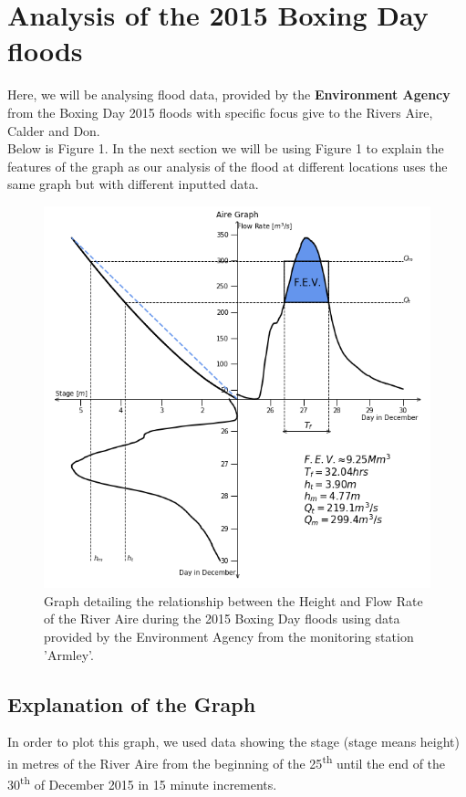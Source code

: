 \documentclass[11 pt, a4paper]{article}
\begin{document}
\section{Analysis of the 2015 Boxing Day floods}
Here, we will be analysing flood data, provided by the {\bf Environment Agency} from the Boxing Day 2015 floods with specific focus give to the Rivers Aire, Calder and Don.\\
Below is Figure 1. In the next section we will be using Figure 1 to explain the features of the graph as our analysis of the flood at different locations uses the same graph but with different inputted data.
\begin{figure}[H]
\begin{center}
\includegraphics[width=.5\linewidth]{Aire-Quadrant_Graph.png}
\caption{Graph detailing the relationship between the Height and Flow Rate of the River Aire during the 2015 Boxing Day floods using data provided by the Environment Agency from the monitoring station 'Armley'.}
\end{center}
\end{figure}

\subsection{Explanation of the Graph}
In order to plot this graph, we used data showing the stage (stage means height) in metres of the River Aire from the beginning of the 25\textsuperscript{th} until the end of the 30\textsuperscript{th} of December 2015 in 15 minute increments.\\ 
\end{document}
